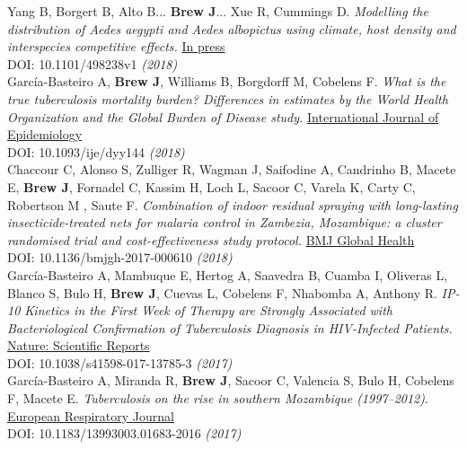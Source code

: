 \documentclass[11pt]{article}
\begin{document}
{{\noindent Yang B, Borgert B, Alto B... \textbf{Brew J}... Xue R, Cummings D. \emph{Modelling the distribution of Aedes aegypti and Aedes albopictus using climate, host density and interspecies competitive effects.} \href{https://www.biorxiv.org/content/biorxiv/early/2018/12/17/498238.full.pdf}{In press} \\ DOI: 10.1101/498238v1 \hfill \emph{(2018)} \\


\noindent García-Basteiro A, \textbf{Brew J}, Williams B, Borgdorff M, Cobelens F. \emph{What is the true tuberculosis mortality burden? Differences in estimates by the World Health Organization and the Global Burden of Disease study.} \href{https://academic.oup.com/ije/advance-article-abstract/doi/10.1093/ije/dyy144/5053290}{International Journal of Epidemiology} \\ DOI: 10.1093/ije/dyy144 \hfill \emph{(2018)} \\

\noindent Chaccour C, Alonso S, Zulliger R, Wagman J, Saifodine A, Candrinho B, Macete E, \textbf{Brew J}, Fornadel C, Kassim H, Loch L, Sacoor C, Varela K,  Carty C, Robertson  M , Saute F. \emph{Combination of indoor residual spraying with long-lasting insecticide-treated nets for malaria control in Zambezia, Mozambique: a cluster randomised trial and cost-effectiveness study protocol.} \href{http://gh.bmj.com/content/3/1/e000610}{BMJ Global Health} \\ DOI: 10.1136/bmjgh-2017-000610 \hfill \emph{(2018)} \\

\noindent García-Basteiro A, Mambuque E, Hertog A, Saavedra B, Cuamba I, Oliveras L, Blanco S, Bulo H, \textbf{Brew J}, Cuevas L, Cobelens F, Nhabomba A, Anthony R. \emph{IP-10 Kinetics in the First Week of Therapy are Strongly Associated with Bacteriological Confirmation of Tuberculosis Diagnosis in HIV-Infected Patients.} \href{https://www.nature.com/articles/s41598-017-13785-3}{Nature: Scientific Reports} \\ DOI: 10.1038/s41598-017-13785-3 \hfill \emph{(2017)} \\

\noindent García-Basteiro A, Miranda R, \textbf{Brew J}, Sacoor C, Valencia S, Bulo H, Cobelens F, Macete E. \emph{Tuberculosis on the rise in southern Mozambique (1997–2012)}. \href{http://erj.ersjournals.com}{European Respiratory Journal} \\
DOI: 10.1183/13993003.01683-2016 \hfill \emph{(2017)} \\

}}
\end{document}
